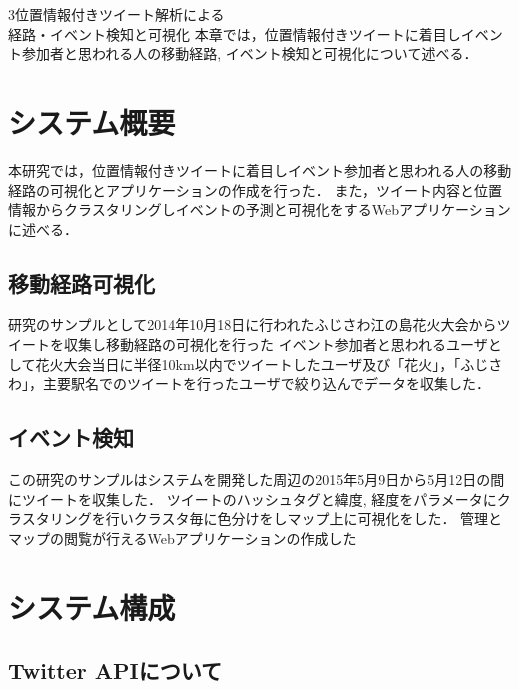 \chapterhead
{3}{位置情報付きツイート解析による\\
経路・イベント検知と可視化}
{本章では，位置情報付きツイートに着目しイベント参加者と思われる人の移動経路, イベント検知と可視化について述べる．}


\section{システム概要}
本研究では，位置情報付きツイートに着目しイベント参加者と思われる人の移動経路の可視化とアプリケーションの作成を行った．
また，ツイート内容と位置情報からクラスタリングしイベントの予測と可視化をするWebアプリケーションに述べる．

\subsection{移動経路可視化}
研究のサンプルとして2014年10月18日に行われたふじさわ江の島花火大会\cite{webpage_fujisawa}からツイートを収集し移動経路の可視化を行った
イベント参加者と思われるユーザとして花火大会当日に半径10km以内でツイートしたユーザ及び「花火」，「ふじさわ」，主要駅名でのツイートを行ったユーザで絞り込んでデータを収集した．


\subsection{イベント検知}
この研究のサンプルはシステムを開発した周辺の2015年5月9日から5月12日の間にツイートを収集した．
ツイートのハッシュタグと緯度, 経度をパラメータにクラスタリングを行いクラスタ毎に色分けをしマップ上に可視化をした．
管理とマップの閲覧が行えるWebアプリケーションの作成した



\newpage

\section{システム構成}
\subsection{Twitter APIについて}
